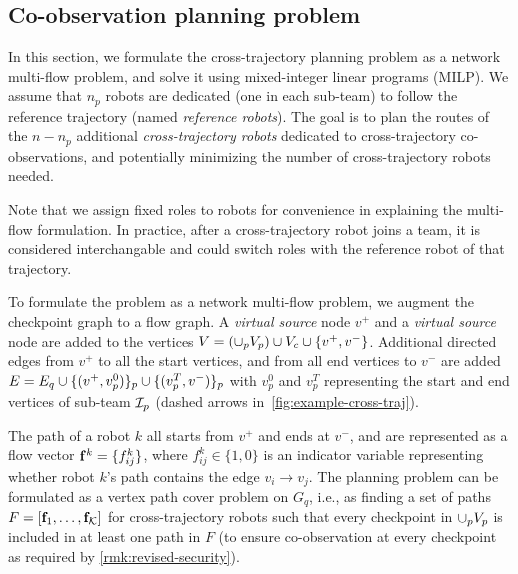 \documentclass[10pt,twocolumn,twoside]{IEEEtran}
\newcommand{\news}{\color{blue}}
\begin{document}

\subsection{Co-observation planning problem}
In this section, we formulate the cross-trajectory planning problem as a network multi-flow problem, and solve it using mixed-integer linear programs (MILP). We assume that $n_p$ robots are dedicated (one in each sub-team) to follow the reference trajectory (named \emph{reference robots}). The goal is to plan the routes of the $n-n_p$ additional \emph{cross-trajectory robots} dedicated to cross-trajectory co-observations, and potentially minimizing the number of cross-trajectory robots needed. 

\begin{remark}
Note that we assign fixed roles to robots for convenience in explaining the multi-flow formulation. In practice, after a cross-trajectory robot joins a team, it is considered interchangable and could switch roles with the reference robot of that trajectory. %
\end{remark}

{\news To formulate the problem as a network multi-flow problem, we augment the checkpoint graph to a flow graph. A \emph{virtual source} node $v^{+}$ and a \emph{virtual source} node are added to the vertices $V= (\cup_p V_p) \cup V_c \cup \{v^{+},v^{-}\}$. Additional directed edges from $v^{+}$ to all the start vertices, and from all end vertices to $v^{-}$ are added $E = E_{q} \cup \{(v^{+},v^{0}_{p})\}_{p} \cup \{( v^{T}_{p},v^{-})\}_{p}$ with $v^0_p$ and $v^T_p$ representing the start and end vertices of sub-team $\mathcal{I}_p$ (dashed arrows in~\cref{fig:example-cross-traj}).}

The path of a robot $k$ all starts from $v^{+}$ and ends at $v^{-}$, and are represented as a flow vector $\mathbf{f}^{k} = \{ f^{k}_{ij} \}$, where $f^{k}_{ij} \in \{1,0\}$ is an indicator variable representing whether robot $k$'s path contains the edge $v_{i}\to v_{j}$. 
The planning problem can be formulated as a vertex path cover problem on $G_{q}$, i.e., as finding a set of paths $F=[\mathbf{f}_{1},\dots, \mathbf{f}_{\mathcal{K}}]$ for cross-trajectory robots such that every checkpoint in $\cup_p V_{p}$ is included in at least one path in $F$ (to ensure co-observation at every checkpoint as required by \cref{rmk:revised-security}). %
\end{document}
